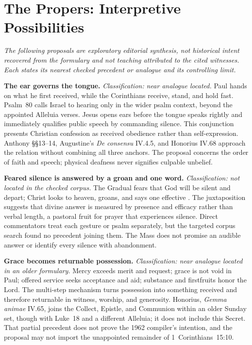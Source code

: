 \sectionguard
\section*{The Propers: Interpretive Possibilities}

\noindent\emph{The following proposals are exploratory editorial synthesis,
not historical intent recovered from the formulary and not teaching
attributed to the cited witnesses. Each states its nearest checked precedent
or analogue and its controlling limit.}

\noindent\textbf{The ear governs the tongue.\enspace{}}
\emph{Classification: near analogue located.} Paul hands on what he first
received, while the Corinthians receive, stand, and hold fast. Psalm~80 calls
Israel to hearing only in the wider psalm context, beyond the appointed Alleluia
verses. Jesus
opens ears before the tongue speaks rightly and immediately qualifies public
speech by commanding silence. This conjunction presents Christian confession
as received obedience rather than self-expression. Anthony §§13--14,
Augustine's \emph{De consensu} IV.4.5, and Honorius IV.68 approach the
relation without combining all three anchors. The proposal concerns the order
of faith and speech; physical deafness never signifies culpable unbelief.

\noindent\textbf{Feared silence is answered by a groan and one word.\enspace{}}
\emph{Classification: not located in the checked corpus.} The Gradual fears
that God will be silent and depart; Christ looks to heaven, groans, and says
one effective . The juxtaposition suggests that divine
answer is measured by presence and efficacy rather than verbal length, a
pastoral fruit for prayer that experiences silence. Direct commentators treat
each gesture or psalm separately, but the targeted corpus search found no
precedent joining them. The Mass does not promise an audible answer or
identify every silence with abandonment.

\noindent\textbf{Grace becomes returnable possession.\enspace{}}
\emph{Classification: near analogue located in an older formulary.} Mercy exceeds
merit and request; grace is not void in Paul; offered service seeks acceptance
and aid; substance and firstfruits honor the Lord. The multi-step mechanism
turns possession into something received and therefore returnable in witness,
 worship, and generosity. Honorius, \emph{Gemma animae} IV.65, joins the
Collect, Epistle, and Communion within an older Sunday set, though with
Luke~18 and a different Alleluia; it does not include this Secret. That partial
precedent does not prove the 1962 compiler's intention, and the
proposal may not import the unappointed remainder of 1~Corinthians~15:10.

